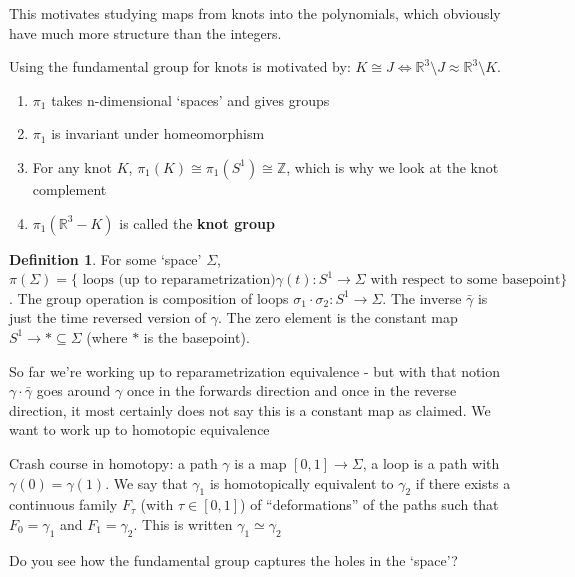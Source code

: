 \documentclass[11pt]{article}
\newcommand{\Z}{\mathbb{Z}}
\newcommand{\R}{\mathbb{R}}
\newcommand{\set}[1]{\{ #1 \}}
\theoremstyle{plain}
\theoremstyle{definition}
\newtheorem{definition}{Definition}
\begin{document}
This motivates studying maps from knots into the polynomials, which obviously have much more structure than the integers.

Using the fundamental group for knots is motivated by: $K \cong J \iff \R^3 \setminus J \approx \R^3 \setminus K$.


\begin{enumerate}
  \item $\pi_1$ takes n-dimensional `spaces' and gives groups
  \item $\pi_1$ is invariant under homeomorphism
  \item For any knot $K$, $\pi_1(K)\cong\pi_1(S^1)\cong \Z$, which is why we look at the knot complement
  \item $\pi_1(\R^3 - K)$ is called the \textbf{knot group}
\end{enumerate}


\begin{definition}
  For some `space' $\Sigma$, $\pi(\Sigma) = \set{\text{ loops (up to reparametrization)} \gamma(t): S^1 \to \Sigma \text{ with respect to some basepoint}}$. The group operation
  is composition of loops $\sigma_1 \cdot \sigma_2 : S^1 \to \Sigma$. The inverse $\bar{\gamma}$ is just the time reversed version of $\gamma$. The zero element is the
  constant map $S^1 \to \ast \subseteq \Sigma$ (where $\ast$ is the  basepoint).

  So far we're working up to reparametrization equivalence - but with that notion $\gamma \cdot \bar{\gamma}$ goes around $\gamma$ once in the forwards direction and once
  in the reverse direction, it most certainly does not say this is a constant map as claimed. We want to work up to homotopic equivalence

  Crash course in homotopy: a path $\gamma$ is a map $[0, 1] \to \Sigma $, a loop is a path with $\gamma(0) = \gamma(1)$.
  We say that $\gamma_1$ is homotopically equivalent to $\gamma_2$ if there exists a continuous family $F_\tau$ (with $\tau\in[0,1]$) of ``deformations'' of the paths such that $F_0 = \gamma_1$
  and $F_1 = \gamma_2$. This is written $\gamma_1 \simeq \gamma_2$

  Do you see how the fundamental group captures the holes in the `space'?
\end{definition}
\end{document}
